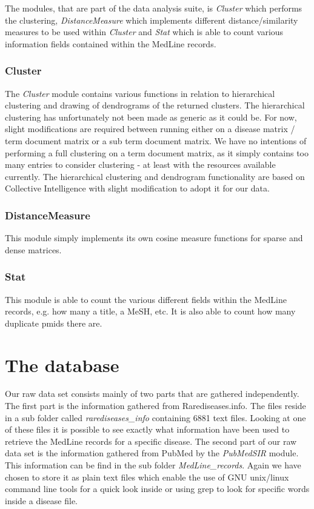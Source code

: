 The modules, that are part of the data analysis suite, is
\textit{Cluster} which performs the clustering,
\textit{DistanceMeasure} which implements different
distance/similarity measures to be used within \textit{Cluster} and
\textit{Stat} which is able to count various information fields
contained within the MedLine records.

\subsubsection{Cluster}
The \textit{Cluster} module contains various functions in relation to
hierarchical clustering and drawing of dendrograms of the returned
clusters. The hierarchical clustering has unfortunately not been made
as generic as it could be. For now, slight modifications are required
between running either on a disease matrix / term document matrix or a
sub term document matrix. We have no intentions of performing a full
clustering on a term document matrix, as it simply contains too many
entries to consider clustering - at least with the resources available
currently. The hierarchical clustering and dendrogram functionality
are based on Collective Intelligence \cite{CollectiveIntelligence}
with slight modification to adopt it for our data.

\subsubsection{DistanceMeasure}
This module simply implements its own cosine measure functions for
sparse and dense matrices.

\subsubsection{Stat}
This module is able to count the various different fields within the
MedLine records, e.g. how many a title, a MeSH, etc. It is also
able to count how many duplicate pmids there are.

\section{The database\label{Database}}

Our raw data set consists mainly of two parts that are gathered
independently. The first part is the information gathered from
Rarediseases.info. The files reside in a sub folder called
\textit{rarediseases\_info} containing 6881 text files. Looking at
one of these files it is possible to see exactly what information have
been used to retrieve the MedLine records for a specific disease. The
second part of our raw data set is the information gathered from PubMed
by the \textit{PubMedSIR} module. This information can be find in the sub folder
\textit{MedLine\_records}. Again we have chosen to store it as plain
text files which enable the use of GNU unix/linux command line tools
for a quick look inside or using grep to look for specific words inside
a disease file.

